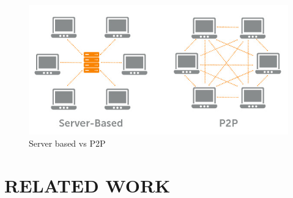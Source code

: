 \documentclass{fisatproject}
\begin{document}
	\begin{center}
		\begin{figure}[h]
			
			\includegraphics[scale=.75]{svp.jpg}
			\caption{Server based vs P2P}
			
		\end{figure}
	\end{center}


\chapter{RELATED WORK}
\end{document}
